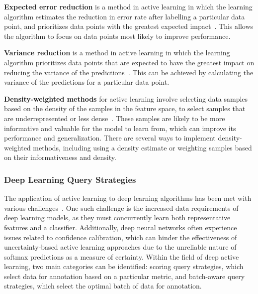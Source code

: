 \textbf{Expected error reduction} is a method in active learning in which the learning algorithm estimates the reduction in error rate after labelling a particular data point, and prioritizes data points with the greatest expected impact~\citep{roy2001toward}. This allows the algorithm to focus on data points most likely to improve performance. 

\textbf{Variance reduction} is a method in active learning in which the learning algorithm prioritizes data points that are expected to have the greatest impact on reducing the variance of the predictions~\citep{cohn1996active}. This can be achieved by calculating the variance of the predictions for a particular data point. 

\textbf{Density-weighted methods} for active learning involve selecting data samples based on the density of the samples in the feature space, to select samples that are underrepresented or less dense~\citep{settles2008analysis}. These samples are likely to be more informative and valuable for the model to learn from, which can improve its performance and generalization. There are several ways to implement density-weighted methods, including using a density estimate or weighting samples based on their informativeness and density.

\subsubsection{Deep Learning Query Strategies}
The application of active learning to deep learning algorithms has been met with various challenges~\citep{ren2021survey}. One such challenge is the increased data requirements of deep learning models, as they must concurrently learn both representative features and a classifier. Additionally, deep neural networks often experience issues related to confidence calibration, which can hinder the effectiveness of uncertainty-based active learning approaches due to the unreliable nature of softmax predictions as a measure of certainty. Within the field of deep active learning, two main categories can be identified: scoring query strategies, which select data for annotation based on a particular metric, and batch-aware query strategies, which select the optimal batch of data for annotation.

